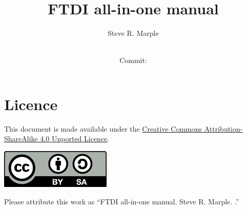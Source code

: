 \documentclass[twoside,a4paper,openany,12pt]{article}
\newcommand{\ccBySaFourUrl}{http://creativecommons.org/licenses/by-sa/4.0/}
\newcommand{\documentAttribution}{``FTDI all-in-one manual. Steve
  R. Marple. \gitCommitYear.''}
\begin{document}
\title{FTDI all-in-one manual}
\author{Steve R. Marple}
\date{\gitCommitDate\\
  \small{Commit: \gitCommit}}
\maketitle
\thispagestyle{empty}
\pagestyle{plain}

{}  
{}  
\section*{Licence}
This document is made available under the \href{\ccBySaFourUrl}{Creative
  Commons Attribution-ShareAlike 4.0 Unported Licence}.

\begin{center}
\href{\ccBySaFourUrl}{\includegraphics{images/by-sa}}
\end{center}

Please attribute this work as \documentAttribution

\sloppy


\clearpage


\appendix
\renewcommand{\thesection}{Appendix~\Alph{section}}



\end{document}
